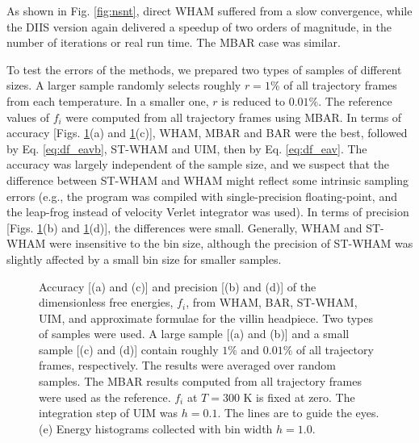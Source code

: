 \documentclass[reprint,aip,jcp,superscriptaddress]{revtex4-1}
\begin{document}
As shown in Fig. \ref{fig:nsnt},
direct WHAM suffered from a slow convergence,
while the DIIS version again
delivered a speedup of two orders of magnitude,
in the number of iterations or real run time.
%
The MBAR case was similar.
%



To test the errors of the methods,
we prepared two types of samples of different sizes.
%
A larger sample randomly selects roughly $r = 1\%$
of all trajectory frames from each temperature.
%
In a smaller one, $r$ is reduced to $0.01\%$.
%
The reference values of $f_i$
were computed from all trajectory frames using MBAR.
%
In terms of accuracy
[Figs. \ref{fig:whamcmp}(a) and \ref{fig:whamcmp}(c)],
WHAM, MBAR and BAR were the best,
followed by Eq. \eqref{eq:df_eavb}, ST-WHAM and UIM,
then by Eq. \eqref{eq:df_eav}.
%
The accuracy was largely independent of the sample size,
and we suspect that the difference
between ST-WHAM and WHAM
might reflect some intrinsic sampling errors
(e.g., the program was compiled with
single-precision floating-point,
and the leap-frog instead of velocity Verlet integrator
was used).
%
In terms of precision
[Figs. \ref{fig:whamcmp}(b) and \ref{fig:whamcmp}(d)],
the differences were small.
%
Generally,
WHAM and ST-WHAM were insensitive to the bin size,
although the precision of ST-WHAM was slightly affected
by a small bin size for smaller samples.



\begin{figure}[h]
  \caption{
    \label{fig:whamcmp}
    Accuracy [(a) and (c)] and precision [(b) and (d)] of
    the dimensionless free energies, $f_i$,
    from WHAM, BAR, ST-WHAM, UIM, and approximate formulae
    for the villin headpiece.
    Two types of samples were used.
    A large sample [(a) and (b)]
    and
    a small sample [(c) and (d)]
    contain roughly
    $1\%$ and $0.01\%$ of all trajectory frames,
    respectively.
    The results were averaged over random samples.
    The MBAR results computed from all trajectory frames
    were used as the reference.
    $f_i$ at $T = 300$ K is fixed at zero.
    The integration step of UIM was $h = 0.1$.
    The lines are to guide the eyes.
    (e) Energy histograms collected
    with bin width $h = 1.0$.
  }
\end{figure}
\end{document}

